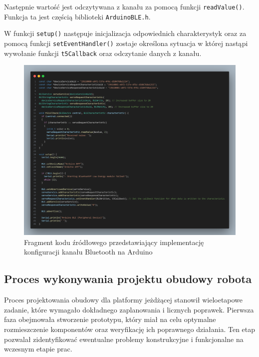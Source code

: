\documentclass{report}
\begin{document}
Następnie wartość jest odczytywana z kanału za pomocą funkcji \texttt{readValue()}. Funkcja ta jest częścią biblioteki \texttt{ArduinoBLE.h}.

W funkcji \texttt{setup()} następuje inicjalizacja odpowiednich charakterystyk oraz za pomocą funkcji \newline \texttt{setEventHandler()} zostaje określona sytuacja w której nastąpi wywołanie funkcji \texttt{t5Callback} oraz odczytanie danych z kanału. 

\begin{figure}[H]
    \centering
    \includegraphics*[width=1.0\textwidth]{"src/code_snaps/bt_con_arduino.png"}
    \caption{Fragment kodu źródłowego przedstawiający implementację konfiguracji kanału Bluetooth na Arduino}
    \label{fig:bt_con_arduino}
\end{figure}


\newpage
\subsection{\Large Proces wykonywania projektu obudowy robota}
%
%

Proces projektowania obudowy dla platformy jeżdżącej stanowił wieloetapowe zadanie, które wymagało dokładnego zaplanowania i licznych poprawek. Pierwsza faza obejmowała stworzenie prototypu, który miał na celu optymalne rozmieszczenie komponentów oraz weryfikację ich poprawnego działania. 
Ten etap pozwalał zidentyfikować ewentualne problemy konstrukcyjne i funkcjonalne na wczesnym etapie prac.
\end{document}
